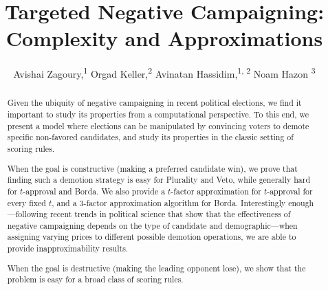 \documentclass[letterpaper]{article} %
\begin{document}
%

\title{Targeted Negative Campaigning: Complexity and Approximations}
\author{Avishai Zagoury,\textsuperscript{\rm 1} Orgad Keller,\textsuperscript{\rm 2} Avinatan Hassidim,\textsuperscript{\rm 1, \rm2} Noam Hazon \textsuperscript{\rm 3}\\}
\maketitle
\begin{abstract}
Given the ubiquity of negative campaigning in recent political elections, we find it important to study its properties from a computational perspective. To this end, we present a model where elections can be manipulated by convincing voters to demote specific non-favored candidates, and study its properties in the classic setting of scoring rules.

When the goal is constructive (making a preferred candidate win),  we prove that finding such a demotion strategy is easy for Plurality and Veto, while generally hard for $t$-approval and Borda. We also provide a $t$-factor approximation for $t$-approval for every fixed $t$, and a 3-factor approximation algorithm for Borda. Interestingly enough---following recent trends in  political science that show that the effectiveness of negative campaigning depends on the type of candidate and demographic---when assigning varying prices to different possible demotion operations, we are able to provide inapproximability results.

When the goal is destructive (making the leading opponent lose), we show that the problem is easy for a broad class of scoring rules.
\end{abstract}
\end{document}
